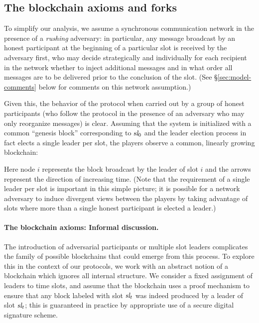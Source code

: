 \subsection{The blockchain axioms and forks}

To simplify our analysis, we assume a synchronous communication
network in the presence of a \emph{rushing} adversary: in particular,
any message broadcast by an honest participant at the beginning of a
particular slot is received by the adversary first, who may decide
strategically and individually for each recipient in the network
whether to inject additional messages and in what order all messages
are to be delivered prior to the conclusion of the slot. (See
\S\ref{sec:model-comments} below for comments on this network
assumption.)

Given this, the behavior of the protocol when carried out by a group
of honest participants (who follow the protocol in the presence of an
adversary who may only reorganize messages) is clear. Assuming that
the system is initialized with a common ``genesis block''
corresponding to $\textsl{sl}_0$ and the leader election process in fact
elects a single leader per slot, the players observe a common,
linearly growing blockchain:
\begin{center}
\end{center}
\noindent
Here node $i$ represents the block broadcast by the leader of slot $i$
and the arrows represent the direction of increasing time. (Note that
the requirement of a single leader per slot is important in this
simple picture; it is possible for a network adversary to induce
divergent views between the players by taking advantage of slots where
more than a single honest participant is elected a leader.)

\paragraph{The blockchain axioms: Informal discussion.}
The introduction of adversarial participants or multiple slot leaders
complicates the family of possible blockchains that could emerge from
this process. To explore this in the context of our protocols, we work
with an abstract notion of a blockchain which
ignores all internal structure. We consider a fixed assignment of
leaders to time slots, and assume that the blockchain uses a proof
mechanism to ensure that any block labeled with slot $\textsl{sl}_t$ was
indeed produced by a leader of slot $\textsl{sl}_t$; this is guaranteed in
practice by appropriate use of a secure digital signature scheme.

